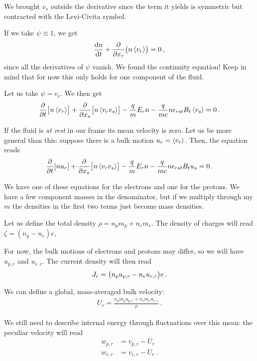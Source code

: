 \documentclass[main.tex]{subfiles}
\begin{document}
We brought \(v_s\) outside the derivative since the term it yields is symmetric but contracted with the Levi-Civita symbol. 

If we take \(\psi \equiv 1\), we get 
%
\begin{align}
\dv{n}{t} + \pdv{}{x_r} \qty(n \expval{v_r})  = 0
\,,
\end{align}
%
since all the derivatives of \(\psi \) vanish. 
We found the continuity equation!
Keep in mind that for now this only holds for one component of the fluid. 

Let us take \(\psi = v_r\). We then get 
%
\begin{align}
\pdv{}{t} \qty[n \expval{v_r}] + 
\pdv{}{x_s} \qty[n \expval{v_r v_s}] 
- \frac{q}{m} E_r n  
- \frac{q}{mc} n \epsilon_{rst} B_t \expval{v_s} = 0
\,.
\end{align}

If the fluid is \emph{at rest} in our frame its mean velocity is zero. 
Let us be more general than this: suppose there is a bulk motion \(u_r = \expval{v_r}\). 
Then, the equation reads 
%
\begin{align}
\pdv{}{t} \qty[n u_r] + 
\pdv{}{x_s} \qty[n \expval{v_r v_s}] 
- \frac{q}{m} E_r n  
- \frac{q}{mc} n \epsilon_{rst} B_t u_s = 0
\,.
\end{align}

We have one of these equations for the electrons and one for the protons. 
We have a few component masses in the denominator, but if we multiply through my \(m\) the densities in the first two terms just become mass densities. 

Let us define the total density \(\rho = n_p m_p + n_e m_e\). 
The density of charges will read \(\zeta = (n_p - n_e) e\), 

For now, the bulk motions of electrons and protons may differ, so we will have \(u_{p, r}\) and \(u_{e, r}\).
The current density will then read  
%
\begin{align}
J_r = \qty(n_p u_{p, r} - n_e u_{e, r}) e
\,.
\end{align}

We can define a global, mass-averaged bulk velocity: 
%
\begin{align}
U_r = \frac{n_p m_p u_{p, r} + n_e m_e u_{e, r}}{\rho }
\,.
\end{align}

We still need to describe internal energy through fluctuations over this mean: the peculiar velocity will read 
%
\begin{align}
w_{p, r} &= v_{p, r} - U_r \\
w_{e, r} &= v_{e, r} - U_r 
\,.
\end{align}
\end{document}
